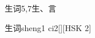 \begin{entry}{生词}{5,7}{⽣、⾔}
  \begin{phonetics}{生词}{sheng1 ci2}[][HSK 2]
  \end{phonetics}
\end{entry}
